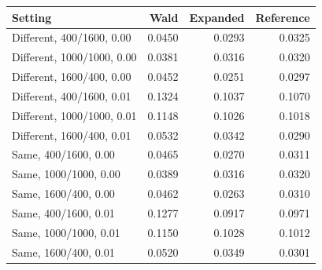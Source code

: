 \begin{tabular}{@{}lrrr@{}}
\toprule
Setting & Wald & Expanded & Reference\\
\midrule
Different, 400/1600, 0.00 & 0.0450 & 0.0293 & 0.0325\\
Different, 1000/1000, 0.00 & 0.0381 & 0.0316 & 0.0320\\
Different, 1600/400, 0.00 & 0.0452 & 0.0251 & 0.0297\\
Different, 400/1600, 0.01 & 0.1324 & 0.1037 & 0.1070\\
Different, 1000/1000, 0.01 & 0.1148 & 0.1026 & 0.1018\\
Different, 1600/400, 0.01 & 0.0532 & 0.0342 & 0.0290\\
Same, 400/1600, 0.00 & 0.0465 & 0.0270 & 0.0311\\
Same, 1000/1000, 0.00 & 0.0389 & 0.0316 & 0.0320\\
Same, 1600/400, 0.00 & 0.0462 & 0.0263 & 0.0310\\
Same, 400/1600, 0.01 & 0.1277 & 0.0917 & 0.0971\\
Same, 1000/1000, 0.01 & 0.1150 & 0.1028 & 0.1012\\
Same, 1600/400, 0.01 & 0.0520 & 0.0349 & 0.0301\\
\bottomrule
\end{tabular}

